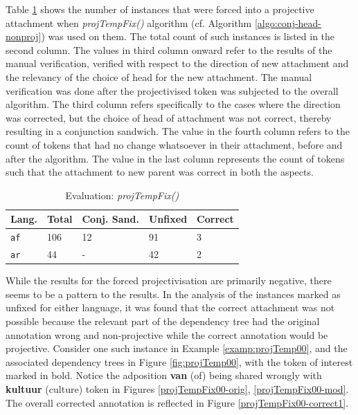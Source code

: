 Table \ref{tab:projTempFixResults} shows the number of instances that were forced into a projective attachment when \textit{projTempFix()} algorithm (cf. Algorithm \ref{algo:conj-head-nonproj}) was used on them. The total count of such instances is listed in the second column. The values in third column onward refer to the results of the manual verification, verified with respect to the direction of new attachment and the relevancy of the choice of head for the new attachment. The manual verification was done after the projectivised token was subjected to the overall algorithm. The third column refers specifically to the cases where the direction was corrected, but the choice of head of attachment was not correct, thereby resulting in a conjunction sandwich. The value in the fourth column refers to the count of tokens that had no change whatsoever in their attachment, before and after the algorithm. The value in the last column represents the count of tokens such that the attachment to new parent was correct in both the aspects.

\begin{table}[H]
    \centering
    \begin{tabular}{|l|l|l|l|l|}
    \hline
    \textbf{Lang.} & \textbf{Total} & Conj. Sand. & Unfixed & Correct\\
    \hline
    \texttt{af} & 106 & 12 & 91 & 3\\
    \texttt{ar} & 44 & - & 42 & 2\\
    \hline
    \end{tabular}
    \caption{Evaluation: \textit{projTempFix()}}
    \label{tab:projTempFixResults}
\end{table}

While the results for the forced projectivisation are primarily negative, there seems to be a pattern to the results. In the analysis of the instances marked as unfixed for either language, it was found that the correct attachment was not possible because the relevant part of the dependency tree had the original annotation wrong and non-projective while the correct annotation would be projective. Consider one such instance in Example \ref{examp:projTemp00}, and the associated dependency trees in Figure \ref{fig:projTemp00}, with the token of interest marked in bold. Notice the adposition \textbf{van} (of) being shared wrongly with \textbf{kultuur} (culture) token in Figures \ref{projTempFix00-orig}, \ref{projTempFix00-mod}. The overall corrected annotation is reflected in Figure \ref{projTempFix00-correct1}.

